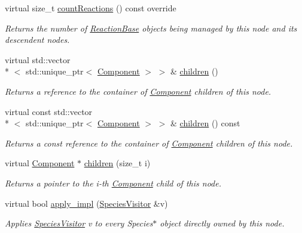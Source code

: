 \begin{DoxyCompactItemize}
virtual size\-\_\-t \hyperlink{classchem_1_1Composite_a40bba31f79b1ca12b70a748ab6973037}{count\-Reactions} () const override
\begin{DoxyCompactList}\small\item\em Returns the number of \hyperlink{classchem_1_1ReactionBase}{Reaction\-Base} objects being managed by this node and its descendent nodes. \end{DoxyCompactList}\item 
virtual std\-::vector\\*
$<$ std\-::unique\-\_\-ptr$<$ \hyperlink{classchem_1_1Component}{Component} $>$ $>$ \& \hyperlink{classchem_1_1Composite_af4fdad429dc7d8d5014961bbd18c8970}{children} ()
\begin{DoxyCompactList}\small\item\em Returns a reference to the container of \hyperlink{classchem_1_1Component}{Component} children of this node. \end{DoxyCompactList}\item 
virtual const std\-::vector\\*
$<$ std\-::unique\-\_\-ptr$<$ \hyperlink{classchem_1_1Component}{Component} $>$ $>$ \& \hyperlink{classchem_1_1Composite_a9c66ed039e22fdafc90627db067fea4b}{children} () const 
\begin{DoxyCompactList}\small\item\em Returns a const reference to the container of \hyperlink{classchem_1_1Component}{Component} children of this node. \end{DoxyCompactList}\item 
virtual \hyperlink{classchem_1_1Component}{Component} $\ast$ \hyperlink{classchem_1_1Composite_adf797cd6faed6b5f42848c712fd9eb8a}{children} (size\-\_\-t i)
\begin{DoxyCompactList}\small\item\em Returns a pointer to the i-\/th \hyperlink{classchem_1_1Component}{Component} child of this node. \end{DoxyCompactList}\item 
virtual bool \hyperlink{classchem_1_1Component_a5dcddefb6fd14be8973a35e9787f87ca}{apply\-\_\-impl} (\hyperlink{classchem_1_1SpeciesVisitor}{Species\-Visitor} \&v)
\begin{DoxyCompactList}\small\item\em Applies \hyperlink{classchem_1_1SpeciesVisitor}{Species\-Visitor} v to every Species$\ast$ object directly owned by this node. \end{DoxyCompactList}\item 

\end{DoxyCompactItemize}
